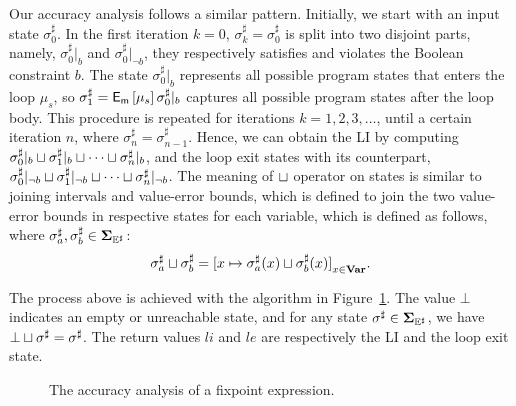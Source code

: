 Our accuracy analysis follows a similar pattern.  Initially, we start
with an input state $\sigma^\sharp_0$.  In the first iteration $k = 0$,
$\sigma^\sharp_k = \sigma^\sharp_0$ is split into two disjoint parts,
namely, $\sigma^\sharp_0|_b$ and $\sigma^\sharp_0|_{\neg b}$, they
respectively satisfies and violates the Boolean constraint $b$.  The state
$\sigma^\sharp_0|_b$ represents all possible program states that enters the
loop $\mu_s$, so $\sigma^\sharp_1 = \operatorname{\mathsf{E}_\mathsf{m}}\left[{\mu_s}\right]{\sigma^\sharp_0|_b}$
captures all possible program states after the loop body.  This procedure
is repeated for iterations $k = 1, 2, 3, \ldots$, until a certain iteration
$n$, where $\sigma^\sharp_n = \sigma^\sharp_{n-1}$.  Hence, we can obtain the
LI by computing $\sigma^\sharp_0|_b \sqcup \sigma^\sharp_1|_b \sqcup \cdots
\sqcup \sigma^\sharp_n|_b$, and the loop exit states with its counterpart,
\ie~$\sigma^\sharp_0|_{\neg b} \sqcup \sigma^\sharp_1|_{\neg b} \sqcup \cdots
\sqcup \sigma^\sharp_n|_{\neg b}$.  The meaning of $\sqcup$ operator on states is
similar to joining intervals and value-error bounds, which is defined to join
the two value-error bounds in respective states for each variable, which is
defined as follows, where $\sigma^\sharp_a, \sigma^\sharp_b \in \mathbf{\Sigma}_{\mathbb{E}^\sharp}$:
\begin{equation}
    \sigma^\sharp_a \join \sigma^\sharp_b =
        {%
            [ x \mapsto \sigma^\sharp_a(x) \join \sigma^\sharp_b(x) ]
        }_{x \in \varset}.
\end{equation}

The process above is achieved with the algorithm in Figure~\ref{po:alg:fix}.
The value $\bot$ indicates an empty or unreachable state, and for any
state $\sigma^\sharp \in \mathbf{\Sigma}_{\mathbb{E}^\sharp}$, we have $\bot \sqcup \sigma^\sharp =
\sigma^\sharp$.  The return values $li$ and $le$ are respectively the LI and
the loop exit state.
\newcommand{\statett}{\ensuremath\sigma^\sharp_{\mathrm{tt}}}
\newcommand{\stateff}{\ensuremath\sigma^\sharp_{\mathrm{ff}}}

\begin{figure}[ht]
    \centering
    \begin{algorithmic}
            \Loop%
                \State{$\statett \gets \sigma^\sharp_k|_b$;}
                \State{$\stateff \gets \sigma^\sharp_k|_{\neg b}$}
                \State{$li \gets li \join \statett$;}
                \State{$le \gets le \join \stateff$}
                \EndIf%
            \EndLoop%
        \EndFunction%
    \end{algorithmic}
    \caption{%
        The accuracy analysis of a fixpoint expression.}\label{po:alg:fix}
\end{figure}
